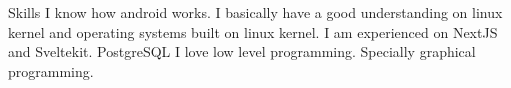
\begin{rubric}{Skills}
\entry*[Android]
	I know how android works. I basically have a good understanding on linux kernel and operating systems built on linux kernel.
\entry*[Web]
	I am experienced on NextJS and Sveltekit.
\entry*[Databases]
	PostgreSQL
\entry*[C++]
	I love low level programming. Specially graphical programming.
\end{rubric}

